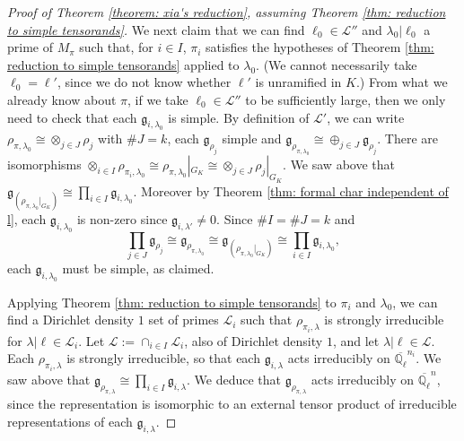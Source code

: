 \documentclass{amsart}
\theoremstyle{definition}
\numberwithin{equation}{section} %
\newcommand{\Qlbar}{\ensuremath{\overline{\mathbb{Q}_\ell}}}
\newcommand{\mc}[1]{\mathcal{#1}}
\newcommand{\mf}[1]{\mathfrak{#1}}
\begin{document}
\begin{proof}[Proof of Theorem \ref{theorem: xia's reduction}, assuming Theorem \ref{thm: reduction to simple tensorands}]
We next claim that we can find $\ell_0 \in \mc{L}''$ and $\lambda_0|\ell_0$ a prime of $M_\pi$ such that, for $i \in I$, $\pi_i$ satisfies the hypotheses of Theorem \ref{thm: reduction to simple tensorands} applied to $\lambda_0$.
(We cannot necessarily take $\ell_0 = \ell'$, since we do not know whether $\ell'$ is unramified in $K$.)
From what we already know about $\pi$, if we take $\ell_0 \in \mc{L}''$ to be sufficiently large, then we only need to check that each $\mf{g}_{i,\lambda_0}$ is simple.
By definition of $\mc{L}'$, we can write $\rho_{\pi,\lambda_0} \cong \otimes_{j \in J} \rho_j$ with $\#J = k$, each $\mf{g}_{\rho_j}$ simple and $\mf{g}_{\rho_{\pi,\lambda_0}} \cong \oplus_{j \in J} \mf{g}_{\rho_j}$.
There are isomorphisms $\otimes_{i \in I} \rho_{\pi_i,\lambda_0} \cong \rho_{\pi,\lambda_0}|_{G_K} \cong \otimes_{j \in J} \rho_j|_{G_K}$.
We saw above that $\mf{g}_{(\rho_{\pi,\lambda_0}|_{G_K})} \cong \prod_{i \in I} \mf{g}_{i,\lambda_0}$.
Moreover by Theorem \ref{thm: formal char independent of l}, each $\mf{g}_{i,\lambda_0}$ is non-zero since $\mf{g}_{i,\lambda'} \neq 0$.
Since $\#I = \#J = k$ and
\[
\prod_{j \in J} \mf{g}_{\rho_j} \cong
\mf{g}_{\rho_{\pi,\lambda_0}} \cong \mf{g}_{(\rho_{\pi,\lambda_0}|_{G_K})} \cong \prod_{i \in I} \mf{g}_{i,\lambda_0},
\]
each $\mf{g}_{i,\lambda_0}$ must be simple, as claimed.

Applying Theorem \ref{thm: reduction to simple tensorands} to $\pi_i$ and $\lambda_0$, we can find a Dirichlet density \( 1 \) set of primes \( \mc{L}_i \) such that \( \rho_{\pi_i,\lambda} \) is strongly irreducible for $\lambda| \ell \in \mathcal{L}_i$.
Let \( \mc{L} := \cap_{i \in I} \mc{L}_i \), also of Dirichlet density \( 1 \), and let $\lambda| \ell \in \mathcal{L}$.
Each $\rho_{\pi_i,\lambda}$ is strongly irreducible, so that each $\mf{g}_{i,\lambda}$ acts irreducibly on $\Qlbar^{n_i}$.
We saw above that $\mf{g}_{\rho_{\pi,\lambda}} \cong \prod_{i \in I} \mf{g}_{i,\lambda}$.
We deduce that $\mf{g}_{\rho_{\pi,\lambda}}$ acts irreducibly on $\Qlbar^n$, since the representation is isomorphic to an external tensor product of irreducible representations of each $\mf{g}_{i,\lambda}$.
\end{proof}
\end{document}
